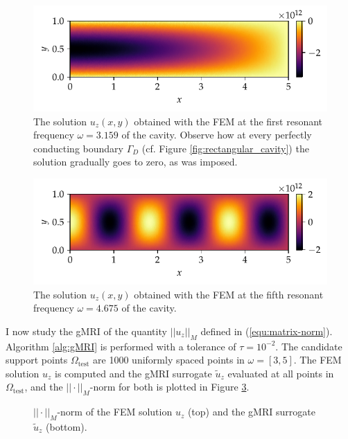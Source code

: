 \documentclass[11pt, a4paper]{article}
\begin{document}
\begin{figure}[ht]
    \centering
    \includegraphics{plots/rectangular_cavity_mode1.pdf}
    \caption{The solution $u_z(x, y)$ obtained with the \acrshort{FEM} at the
    first resonant frequency $\omega = 3.159$ of the cavity. Observe how at
    every perfectly conducting boundary $\Gamma_D$ (cf. Figure
    \ref{fig:rectangular_cavity}) the solution gradually goes to zero, as was imposed.}
    \label{fig:rectangular-cavity-mode1}
\end{figure}

\begin{figure}[ht]
    \centering
    \includegraphics{plots/rectangular_cavity_mode5.pdf}
    \caption{The solution $u_z(x, y)$ obtained with the \acrshort{FEM} at the
    fifth resonant frequency $\omega = 4.675$ of the cavity.}
    \label{fig:rectangular-cavity-mode5}
\end{figure}

I now study the \acrshort{gMRI} of the quantity $||u_z||_M$ defined in
(\ref{equ:matrix-norm}). Algorithm \ref{alg:gMRI} is performed
with a tolerance of $\tau = 10^{-2}$. The candidate support points $\Omega_{\mathrm{test}}$
are 1000 uniformly spaced points in $\omega = [3, 5]$. The \acrshort{FEM} solution $u_z$
is computed and the \acrshort{gMRI} surrogate $\tilde{u}_z$ evaluated at all points in $\Omega_{\mathrm{test}}$,
and the $||\cdot||_M$-norm for both is plotted in Figure \ref{fig:rectangular-cavity-norms}. 

\begin{figure}[ht]
    \centering
    
    \caption{$||\cdot||_M$-norm of the \acrshort{FEM} solution $u_z$ (top) and the 
    \acrshort{gMRI} surrogate $\tilde{u}_z$ (bottom).}
    \label{fig:rectangular-cavity-norms}
\end{figure}
\end{document}
